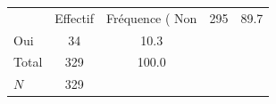 {
\def\sym#1{\ifmmode^{#1}\else\(^{#1}\)\fi}
\begin{tabular}{l*{1}{cc}}
\toprule
            &    Effectif&Fréquence (%
\midrule
Non         &         295&        89.7\\
Oui         &          34&        10.3\\
Total       &         329&       100.0\\
\midrule
\(N\)       &         329&            \\
\bottomrule
\end{tabular}
}
